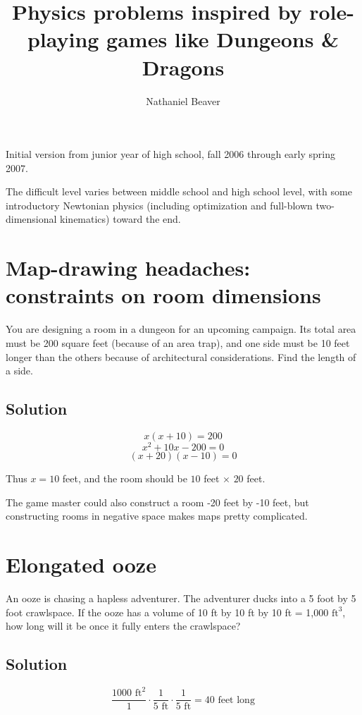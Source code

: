 \documentclass[12pt,letterpaper]{article}
\author{Nathaniel Beaver}
\title{Physics problems inspired by role-playing games like Dungeons \& Dragons}
\begin{document}
\maketitle

Initial version from junior year of high school, fall 2006 through early spring 2007.

The difficult level varies between middle school and high school level, with some introductory Newtonian physics (including optimization and full-blown two-dimensional kinematics) toward the end.

\section{Map-drawing headaches: constraints on room dimensions}

You are designing a room in a dungeon for an upcoming campaign. Its total area must be 200 square feet (because of an area trap), and one side must be 10 feet longer than the others because of architectural considerations. Find the length of a side.

\subsection{Solution}

\[x(x+10) = 200\]
\[x^2 + 10x - 200 = 0\]
\[(x+20)(x-10) = 0\]

Thus $x = 10$ feet, and the room should be $10$ feet $\times$ $20$ feet.

The game master could also construct a room -20 feet by -10 feet, but constructing rooms in negative space makes maps pretty complicated.

\section{Elongated ooze}

An ooze is chasing a hapless adventurer. The adventurer ducks into a 5 foot by 5 foot crawlspace. If the ooze has a volume of 10 ft by 10 ft by 10 ft = 1,000 $\textrm{ft}^3$, how long will it be once it fully enters the crawlspace?

\subsection{Solution}

\[
\frac{1000 \textrm{ ft}^2}{1}
\cdot
\frac{1}{5 \textrm{ ft}}
\cdot
\frac{1}{5 \textrm{ ft}}
=
40 \textrm{ feet long}
\]
\end{document}
